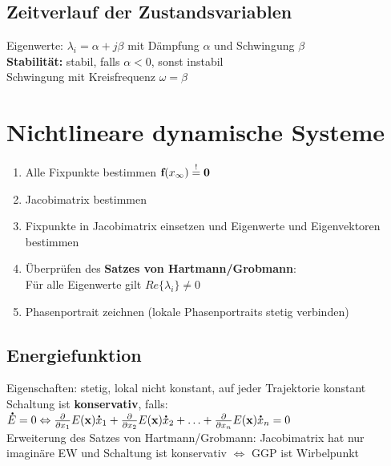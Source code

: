 \documentclass[fs, footer]{latex4ei}
\begin{document}
\begin{multicols*}{4}
		\subsection{Zeitverlauf der Zustandsvariablen}
		Eigenwerte: $\lambda_i = \alpha + j\beta$ mit Dämpfung $\alpha$ und Schwingung $\beta$\\
		\textbf{Stabilität:} stabil, falls $\alpha < 0$, sonst instabil\\
		Schwingung mit Kreisfrequenz $\omega = \beta$\\
\section{Nichtlineare dynamische Systeme}
	\begin{enumerate}
		\item Alle Fixpunkte bestimmen $\textbf{f}(x_\infty) \stackrel{!}{=} \textbf{0}$
		\item Jacobimatrix bestimmen
		\item Fixpunkte in Jacobimatrix einsetzen und Eigenwerte und Eigenvektoren bestimmen
		\item Überprüfen des \textbf{Satzes von Hartmann/Grobmann}: \\Für alle Eigenwerte gilt $Re\{\lambda_i\} \neq 0$
		\item Phasenportrait zeichnen (lokale Phasenportraits stetig verbinden)
	\end{enumerate}
\subsection{Energiefunktion}
Eigenschaften: stetig, lokal nicht konstant, auf jeder Trajektorie konstant\\
Schaltung ist \textbf{konservativ}, falls:\\
$\accentset{\mbox{\textrm{\large\bfseries .}} }{E} = 0 \Leftrightarrow \frac{\partial}{\partial x_1} E(\textbf{x}) \accentset{\mbox{\textrm{\large\bfseries .}} }{x}_1 + \frac{\partial}{\partial x_2} E(\textbf{x}) \accentset{\mbox{\textrm{\large\bfseries .}} }{x}_2 + \hdots + \frac{\partial}{\partial x_n} E(\textbf{x}) \accentset{\mbox{\textrm{\large\bfseries .}} }{x}_n = 0$\\
Erweiterung des Satzes von Hartmann/Grobmann: Jacobimatrix hat nur imaginäre EW und Schaltung ist konservativ $\Leftrightarrow$ GGP ist Wirbelpunkt\\

\end{multicols*}
\end{document}

